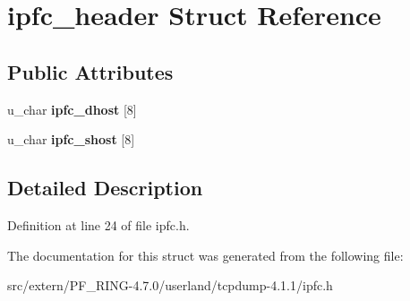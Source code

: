 \hypertarget{structipfc__header}{
\section{ipfc\_\-header Struct Reference}
\label{structipfc__header}
}
\subsection*{Public Attributes}
\begin{DoxyCompactItemize}
\item 
\hypertarget{structipfc__header_abc2643c8fad93c446c0711d3ccda49fc}{
u\_\-char {\bfseries ipfc\_\-dhost} \mbox{[}8\mbox{]}}
\label{structipfc__header_abc2643c8fad93c446c0711d3ccda49fc}

\item 
\hypertarget{structipfc__header_a86a656b1f9dfe402811ec6547e9f6040}{
u\_\-char {\bfseries ipfc\_\-shost} \mbox{[}8\mbox{]}}
\label{structipfc__header_a86a656b1f9dfe402811ec6547e9f6040}

\end{DoxyCompactItemize}


\subsection{Detailed Description}


Definition at line 24 of file ipfc.h.



The documentation for this struct was generated from the following file:\begin{DoxyCompactItemize}
\item 
src/extern/PF\_\-RING-\/4.7.0/userland/tcpdump-\/4.1.1/ipfc.h\end{DoxyCompactItemize}
